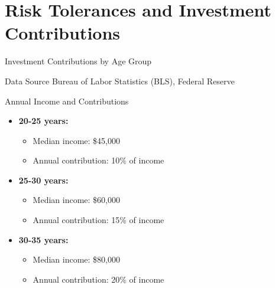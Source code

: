 \documentclass{beamer}
\begin{document}
\section{Risk Tolerances and Investment Contributions}
\begin{frame}{Investment Contributions by Age Group}
    \begin{block}{Data Source}
        Bureau of Labor Statistics (BLS), Federal Reserve
    \end{block}
    \begin{block}{Annual Income and Contributions}
        \begin{itemize}
            \item \textbf{20-25 years:} 
            \begin{itemize}
                \item Median income: \$45,000
                \item Annual contribution: 10\% of income
            \end{itemize}
            \item \textbf{25-30 years:} 
            \begin{itemize}
                \item Median income: \$60,000
                \item Annual contribution: 15\% of income
            \end{itemize}
            \item \textbf{30-35 years:} 
            \begin{itemize}
                \item Median income: \$80,000
                \item Annual contribution: 20\% of income
            \end{itemize}
        \end{itemize}
    \end{block}
\end{frame}
\end{document}
